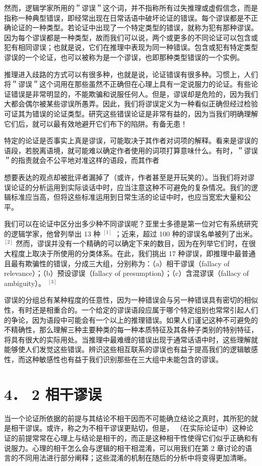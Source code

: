 然而，逻辑学家所用的＂谬误＂这个词，并不指称所有过失推理或虚假信念，而是指称一种典型错误，即经常出现在日常话语中破坏论证的错误。每个谬误都是不正确论证的一种类型。若论证中出现了一个特定类型的错误，就称为犯有那种谬误。因为每个谬误都是一种类型，故而我们可以说，两个或更多的不同论证可以包含或犯有相同谬误；也就是说，它们在推理中表现为同一种错误。包含或犯有特定类型谬误的一个论证，也可以被称为是一个谬误，也即那种类型错误的一个实例。

推理进入歧路的方式可以有很多种，也就是说，论证错误有很多种。习惯上，人们将＂谬误＂这个词用在那些虽然不正确但在心理上具有一定说服力的论证。有些论证错误是非常明显的，不能欺骗和说服任何人。但是，谬误却是危险的，因为我们大都会偶尔被某些谬误所愚弄。因此，我们将谬误定义为一种看似正确但经过检验可证其为错误的论证类型。研究这些错误论证是非常有益的，因为当我们明确理解它们后，就可以最有效地避开它们布下的陷阱。有备无患！

特定的论证是否事实上真是谬误，可能取决于其作者对词项的解释。看来是谬误的语段，若脱离语境，就可能难以确定作者使用的词项打算意味什么。有时，＂谬误＂的指责就会不公平地对准这样的语段，而其作者

想要表达的观点却被批评者漏掉了（或许，作者甚至是开玩笑的）。当我们将对谬误论证的分析运用到实际谈话中时，应当注意这种不可避免的复杂情况。我们的逻辑标准应当高，但将这些标准运用到日常生活的论证中时，也应当宽宏大量和公平。

我们可以在论证中区分出多少种不同谬误呢？亚里士多德是第一位对它有系统研究的逻辑学家，他曾列举出 13 种 ${ }^{[1]}$ ；近来，超过 100 种的谬误名单被列了出米。 ${ }^{[2]}$ 然而，谬误并没有一个精确的可以确定下来的数目，因为在列举它们时，在很大程度上取决于所使用的分类体系。在此，我们挑出 17 种谬误，即推理中最普通且最有欺骗性的错误，分成三大组，分别称为：（a）相干谬误（fallacy of relevance）；（b）预设谬误（fallacy of presumption）；（c）含混谬误（fallacy of ambiguity）。 ${ }^{[3]}$

谬误的分组总有某种程度的任意性，因为一种错误会与另一种错误具有密切的相似性，有时还是相重合的。一个给定的谬误语段应属于哪个特定组别也常常引起人们的争论，因为语段中可能会有一个以上的推理错误。如果人们谨记这种不可避免的不精确性，那么理解三种主要种类的每一种本质特征及其各种子类别的特别特征，将具有很大的实际用处。当推理中最难缠的错误出现于通常话语中时，这些理解就能够使人们发觉这些错误。辨识这些相互联系的谬误也有益于提高我们的逻辑敏感性，而这种敏感性也有益于我们识别那些在三大组中未能包含的谬误。

\section*{4． 2 相干谬误}
当一个论证所依据的前提与其结论不相干因而不可能确立结论之真时，其所犯的就是相干谬误。或许，称之为不相干谬误更贴切，但是， （在实际论证中）这种论证的前提常常在心理上与结论是相干的，而正是这种相干性使得它们似乎正确和有说服力。心理的相干怎么会与逻辑的相干相混淆，可以用我们在第 2 章讨论的语言的不同用法进行部分阐释；这些混淆的机制在随后的分析中将变得更加清晰。

